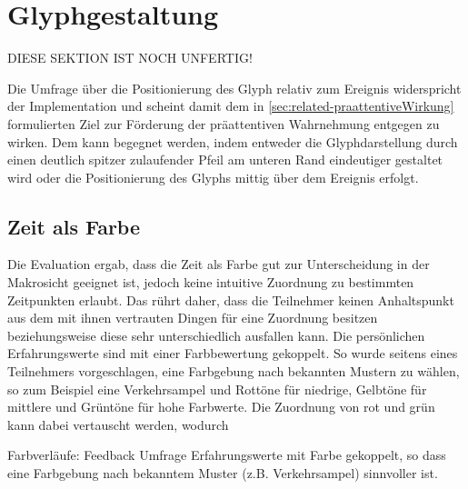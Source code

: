 \section{Glyphgestaltung}
DIESE SEKTION IST NOCH UNFERTIG!

Die Umfrage über die Positionierung des Glyph relativ zum Ereignis widerspricht der Implementation und scheint damit dem in \autoref{sec:related-praattentiveWirkung} formulierten Ziel zur Förderung der präattentiven Wahrnehmung entgegen zu wirken. Dem kann begegnet werden, indem entweder die Glyphdarstellung durch einen deutlich spitzer zulaufender Pfeil am unteren Rand eindeutiger gestaltet wird oder die Positionierung des Glyphs mittig über dem Ereignis erfolgt.

\subsection*{Zeit als Farbe}\label{sec:disc:farbgebung}
Die Evaluation ergab, dass die Zeit als Farbe gut zur Unterscheidung in der Makrosicht geeignet ist, jedoch keine intuitive Zuordnung zu bestimmten Zeitpunkten erlaubt. Das rührt daher, dass die Teilnehmer keinen Anhaltspunkt aus dem mit ihnen vertrauten Dingen für eine Zuordnung besitzen beziehungsweise diese sehr unterschiedlich ausfallen kann. Die persönlichen Erfahrungswerte sind mit einer Farbbewertung gekoppelt. So wurde seitens eines Teilnehmers vorgeschlagen, eine Farbgebung nach bekannten Mustern zu wählen, so zum Beispiel eine Verkehrsampel und Rottöne für niedrige, Gelbtöne für mittlere und Grüntöne für hohe Farbwerte. Die Zuordnung von rot und grün kann dabei vertauscht werden, wodurch 

Farbverläufe: Feedback Umfrage
Erfahrungswerte mit Farbe gekoppelt, so dass eine Farbgebung nach bekanntem Muster (z.B. Verkehrsampel) sinnvoller ist.

